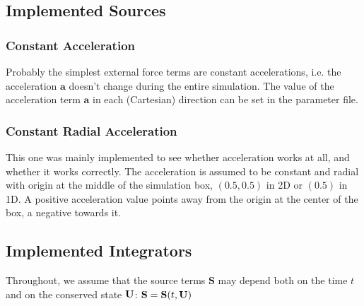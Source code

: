 \subsection{Implemented Sources}\label{chap:implemented-sources}




\subsubsection*{Constant Acceleration}

Probably the simplest external force terms are constant accelerations, i.e. the acceleration $\mathbf{a}$ doesn't change during the entire simulation.
The value of the acceleration term $\mathbf{a}$ in each (Cartesian) direction can be set in the parameter file.









\subsubsection*{Constant Radial Acceleration}

This one was mainly implemented to see whether acceleration works at all, and whether it works correctly.
The acceleration is assumed to be constant and radial with origin at the middle of the simulation box, $(0.5, 0.5)$ in 2D or $(0.5)$ in 1D.
A positive acceleration value points away from the origin at the center of the box, a negative towards it.












\subsection{Implemented Integrators}\label{chap:integrators}

\newcommand{\KB}{\mathbf{K}}
\newcommand{\SB}{\mathbf{S}}

Throughout, we assume that the source terms $\SB$ may depend both on the time $t$ and on the conserved state $\mathbf{U}$: $\SB = \SB(t, \U)$


